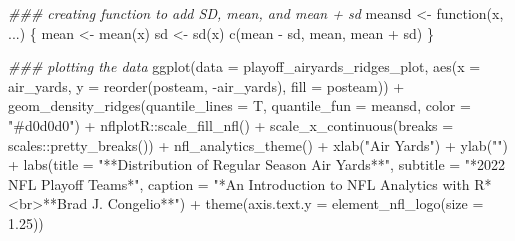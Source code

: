 \documentclass[
  letterpaper,
]{krantz}
\newenvironment{Shaded}{\begin{snugshade}}{\end{snugshade}}
\newcommand{\AttributeTok}[1]{\textcolor[rgb]{0.40,0.45,0.13}{#1}}
\newcommand{\ControlFlowTok}[1]{\textcolor[rgb]{0.00,0.23,0.31}{#1}}
\newcommand{\DocumentationTok}[1]{\textcolor[rgb]{0.37,0.37,0.37}{\textit{#1}}}
\newcommand{\FloatTok}[1]{\textcolor[rgb]{0.68,0.00,0.00}{#1}}
\newcommand{\FunctionTok}[1]{\textcolor[rgb]{0.28,0.35,0.67}{#1}}
\newcommand{\NormalTok}[1]{\textcolor[rgb]{0.00,0.23,0.31}{#1}}
\newcommand{\OtherTok}[1]{\textcolor[rgb]{0.00,0.23,0.31}{#1}}
\newcommand{\SpecialCharTok}[1]{\textcolor[rgb]{0.37,0.37,0.37}{#1}}
\newcommand{\StringTok}[1]{\textcolor[rgb]{0.13,0.47,0.30}{#1}}
\begin{document}
\begin{Shaded}
\begin{Highlighting}[]
\DocumentationTok{\#\#\# creating function to add SD, mean, and mean + sd}
\NormalTok{meansd }\OtherTok{\textless{}{-}} \ControlFlowTok{function}\NormalTok{(x, ...) \{}
\NormalTok{  mean }\OtherTok{\textless{}{-}} \FunctionTok{mean}\NormalTok{(x)}
\NormalTok{  sd }\OtherTok{\textless{}{-}} \FunctionTok{sd}\NormalTok{(x)}
  \FunctionTok{c}\NormalTok{(mean }\SpecialCharTok{{-}}\NormalTok{ sd, mean, mean }\SpecialCharTok{+}\NormalTok{ sd)}
\NormalTok{\}}

\DocumentationTok{\#\#\# plotting the data}
\FunctionTok{ggplot}\NormalTok{(}\AttributeTok{data =}\NormalTok{ playoff\_airyards\_ridges\_plot, }\FunctionTok{aes}\NormalTok{(}\AttributeTok{x =}\NormalTok{ air\_yards,}
                                                \AttributeTok{y =} \FunctionTok{reorder}\NormalTok{(posteam,}
                                                            \SpecialCharTok{{-}}\NormalTok{air\_yards),}
                                                \AttributeTok{fill =}\NormalTok{ posteam)) }\SpecialCharTok{+}
  \FunctionTok{geom\_density\_ridges}\NormalTok{(}\AttributeTok{quantile\_lines =}\NormalTok{ T,}
                      \AttributeTok{quantile\_fun =}\NormalTok{ meansd,}
                      \AttributeTok{color =} \StringTok{"\#d0d0d0"}\NormalTok{) }\SpecialCharTok{+}
\NormalTok{  nflplotR}\SpecialCharTok{::}\FunctionTok{scale\_fill\_nfl}\NormalTok{() }\SpecialCharTok{+}
  \FunctionTok{scale\_x\_continuous}\NormalTok{(}\AttributeTok{breaks =}\NormalTok{ scales}\SpecialCharTok{::}\FunctionTok{pretty\_breaks}\NormalTok{()) }\SpecialCharTok{+}
  \FunctionTok{nfl\_analytics\_theme}\NormalTok{() }\SpecialCharTok{+}
  \FunctionTok{xlab}\NormalTok{(}\StringTok{"Air Yards"}\NormalTok{) }\SpecialCharTok{+}
  \FunctionTok{ylab}\NormalTok{(}\StringTok{""}\NormalTok{) }\SpecialCharTok{+}
  \FunctionTok{labs}\NormalTok{(}\AttributeTok{title =} \StringTok{"**Distribution of Regular Season Air Yards**"}\NormalTok{,}
       \AttributeTok{subtitle =} \StringTok{"*2022 NFL Playoff Teams*"}\NormalTok{,}
       \AttributeTok{caption =} \StringTok{"*An Introduction to NFL Analytics with R*\textless{}br\textgreater{}**Brad J. Congelio**"}\NormalTok{) }\SpecialCharTok{+}
  \FunctionTok{theme}\NormalTok{(}\AttributeTok{axis.text.y =} \FunctionTok{element\_nfl\_logo}\NormalTok{(}\AttributeTok{size =} \FloatTok{1.25}\NormalTok{))}
\end{Highlighting}
\end{Shaded}
\end{document}
